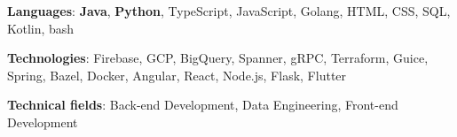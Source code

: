 \hspace{-3mm}\textbf{Languages}: \textbf{Java}, \textbf{Python}, TypeScript, JavaScript, Golang, HTML, CSS, SQL, Kotlin, bash

\hspace{-3mm}\textbf{Technologies}: Firebase, GCP, BigQuery, Spanner, gRPC, Terraform, Guice, Spring, Bazel, Docker, Angular, React, Node.js, Flask, Flutter

\hspace{-3mm}\textbf{Technical fields}: Back-end Development, Data Engineering, Front-end Development
